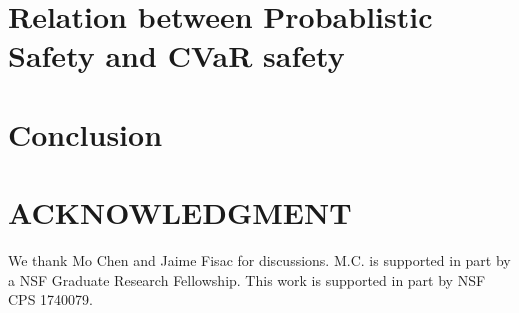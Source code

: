\documentclass[letterpaper, 10 pt, conference]{ieeeconf}  %
\begin{document}
\section{Relation between Probablistic Safety and CVaR safety}\label{lemmaconnection}







\section{Conclusion}\label{conclusion}

\section*{ACKNOWLEDGMENT}
We thank Mo Chen and Jaime Fisac for discussions.
M.C. is supported in part by a NSF Graduate Research Fellowship.
This work is supported in part by NSF CPS 1740079.


\addtolength{\textheight}{-2cm}   %


\end{document}
